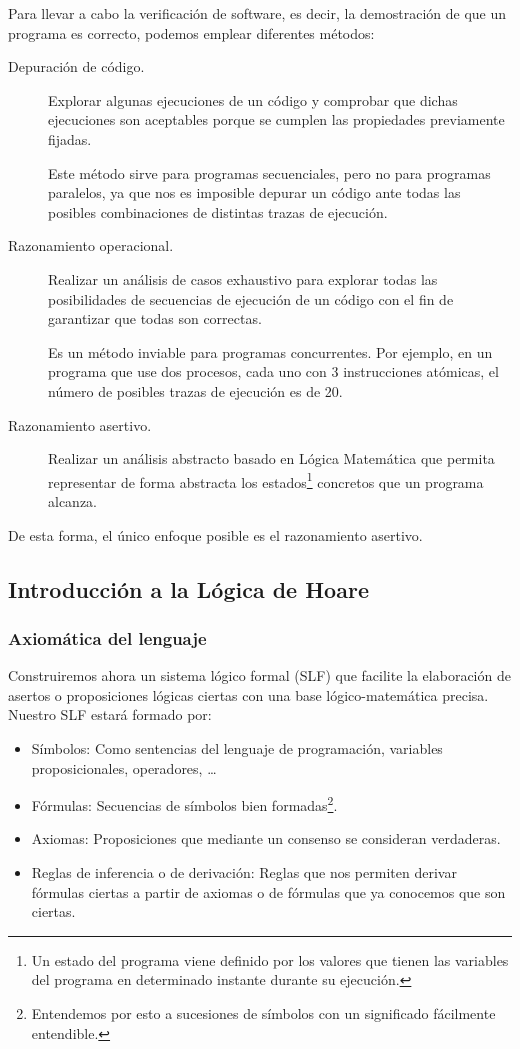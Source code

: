 Para llevar a cabo la verificación de software, es decir, la demostración de que un programa es correcto, podemos emplear diferentes métodos:
\begin{description}
    \item [Depuración de código.] Explorar algunas ejecuciones de un código y comprobar que dichas ejecuciones son aceptables porque se cumplen las propiedades previamente fijadas.

        Este método sirve para programas secuenciales, pero no para programas paralelos, ya que nos es imposible depurar un código ante todas las posibles combinaciones de distintas trazas de ejecución.
    \item [Razonamiento operacional.] Realizar un análisis de casos exhaustivo para explorar todas las posibilidades de secuencias de ejecución de un código con el fin de garantizar que todas son correctas.

        Es un método inviable para programas concurrentes. Por ejemplo, en un programa que use dos procesos, cada uno con 3 instrucciones atómicas, el número de posibles trazas de ejecución es de 20.
    \item [Razonamiento asertivo.] Realizar un análisis abstracto basado en Lógica Matemática que permita representar de forma abstracta los estados\footnote{Un estado del programa viene definido por los valores que tienen las variables del programa en determinado instante durante su ejecución.} concretos que un programa alcanza.
\end{description}
De esta forma, el único enfoque posible es el razonamiento asertivo.

\subsection{Introducción a la Lógica de Hoare}
\subsubsection{Axiomática del lenguaje}
Construiremos ahora un sistema lógico formal (SLF) que facilite la elaboración de asertos o proposiciones lógicas ciertas con una base lógico-matemática precisa.\\

Nuestro SLF estará formado por:
\begin{itemize}
    \item Símbolos: Como sentencias del lenguaje de programación, variables proposicionales, operadores, \ldots
    \item Fórmulas: Secuencias de símbolos bien formadas\footnote{Entendemos por esto a sucesiones de símbolos con un significado fácilmente entendible.}.
    \item Axiomas: Proposiciones que mediante un consenso se consideran verdaderas.
    \item Reglas de inferencia o de derivación: Reglas que nos permiten derivar fórmulas ciertas a partir de axiomas o de fórmulas que ya conocemos que son ciertas.
\end{itemize}

